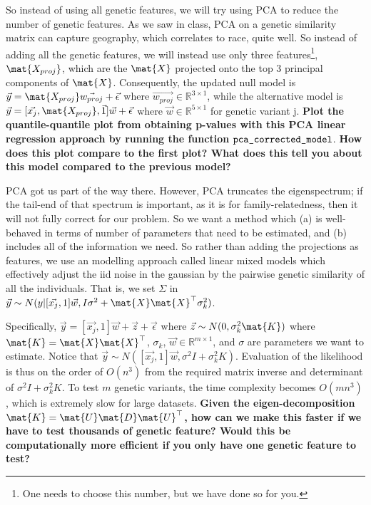 \documentclass[preview]{standalone}
\begin{document}
\begin{Parts}
So instead of using all genetic features, we will try using PCA to reduce the number of genetic features. As we saw in class, PCA on a genetic similarity matrix can capture geography, which correlates to race, quite well. So instead of adding all the genetic features, we will instead use only three features\footnote{One needs to choose this number, but we have done so for you.}, $\mat{X_{proj}}$, which are the $\mat{X}$ projected onto the top 3 principal components of $\mat{X}$. Consequently, the updated null model is  $\vec{y} = \mat{X_{proj}}\vec{w_{proj}} + \vec{\epsilon}$ where $\vec{w_{proj}} \in \mathbb{R}^{3 \times 1}$, while the alternative model is $\vec{y} = [\vec{x_j}, \mat{X_{proj}}, \vec{1}] \vec{w} + \vec{\epsilon}$ where $\vec{w} \in \mathbb{R}^{5 \times 1}$ for genetic variant j.
\textbf{Plot the quantile-quantile plot from obtaining p-values with this PCA linear regression approach by running the function} $\verb|pca_corrected_model|$.
\textbf{How does this plot compare to the first plot? What does this tell you about this model compared to the previous model?}
	
	
	
	\Part PCA got us part of the way there. However, PCA truncates the eigenspectrum; if the tail-end of that spectrum is important, as it is for family-relatedness, then it will not fully correct for our problem. So we want a method which (a) is well-behaved in terms of number of parameters that need to be estimated, and (b) includes all of the information we need. So rather than adding the projections as features, we use an modelling approach called linear mixed models which effectively adjust the iid noise in the gaussian by the pairwise genetic similarity of all the individuals. That is, we set $\Sigma$ in $\vec{y} \sim N(y|[\vec{x_j}, 1] \vec{w}, I \sigma^2 + \mat{X}\mat{X}^\top \sigma^2_k)$.
	
	Specifically, $\vec{y} = [\vec{x_j}, 1] \vec{w} + \vec{z} + \vec{\epsilon}$ where $\vec{z} \sim N(0, \sigma_k^2\mat{K})$ where $\mat{K} = \mat{X}\mat{X}^\top$, $\sigma_k$,  $\vec{w} \in \mathbb{R}^{m \times 1}$, and $\sigma$ are parameters we want to estimate. Notice that $\vec{y} \sim N([\vec{x_j}, 1] \vec{w}, \sigma^2I + \sigma_k^2K)$. Evaluation of the likelihood is thus on the order of $O(n^3)$ from the required matrix inverse and determinant of $\sigma^2I + \sigma_k^2K$. To test $m$ genetic variants, the time complexity becomes $O(mn^3)$, which is extremely slow for large datasets. \textbf{Given the eigen-decomposition $\mat{K} = \mat{U}\mat{D}\mat{U}^\top$, how can we make this faster if we have to test thousands of genetic feature? Would this be computationally more efficient if you only have one genetic feature to test?}


\end{Parts}
\end{document}
